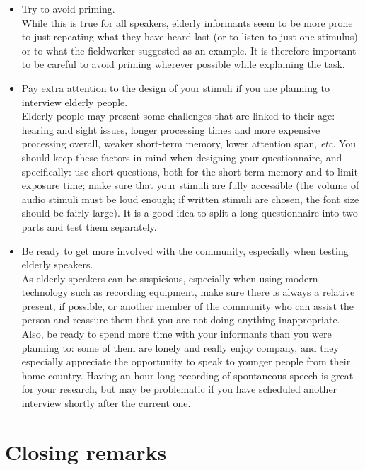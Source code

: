 \documentclass[output=paper,hidelinks]{langscibook}
\begin{document}
\begin{itemize}
\item Try to avoid priming.\\
While this is true for all speakers, elderly informants seem to be more prone to just repeating what they have heard last (or to listen to just one stimulus) or to what the fieldworker suggested as an example. It is therefore important to be careful to avoid priming wherever possible while explaining the task. 
\item Pay extra attention to the design of your stimuli if you are planning to interview elderly people.\\
Elderly people may present some challenges that are linked to their age: hearing and sight issues, longer processing times and more expensive processing overall, weaker short-term memory, lower attention span, \textit{etc}. You should keep these factors in mind when designing your questionnaire, and specifically: use short questions, both for the short-term memory and to limit exposure time; make sure that your stimuli are fully accessible (the volume of audio stimuli must be loud enough; if written stimuli are chosen, the font size should be fairly large). It is a good idea to split a long questionnaire into two parts and test them separately.
\item Be ready to get more involved with the community, especially when testing elderly speakers.\\
As elderly speakers can be suspicious, especially when using modern technology such as recording equipment, make sure there is always a relative present, if possible, or another member of the community who can assist the person and reassure them that you are not doing anything inappropriate. Also, be ready to spend more time with your informants than you were planning to: some of them are lonely and really enjoy company, and they especially appreciate the opportunity to speak to younger people from their home country. Having an hour-long recording of spontaneous speech is great for your research, but may be problematic if you have scheduled another interview shortly after the current one.
\end{itemize}

\section{Closing remarks}
\end{document}
